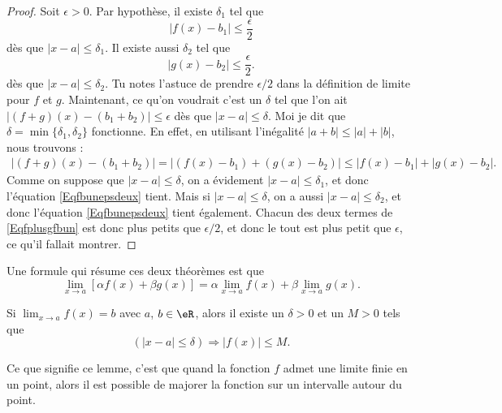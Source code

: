 \begin{proof}
	Soit $\epsilon>0$. Par hypothèse, il existe $\delta_1$ tel que
	\begin{equation}	\label{Eqfbunepsdeux}
	  | f(x)-b_1 |\leq \frac{ \epsilon }{ 2 }
	\end{equation}
	dès que $| x-a |\leq\delta_1$. Il existe aussi $\delta_2$ tel que 
	\begin{equation} 	\label{Eqgbdeuxepsdeux}
	  | g(x)-b_2 |\leq \frac{ \epsilon }{ 2 }.
	\end{equation}
	dès que $| x-a |\leq \delta_2$. Tu notes l'astuce de prendre $\epsilon/2$ dans la définition de limite pour $f$ et $g$. Maintenant, ce qu'on voudrait c'est un $\delta$ tel que l'on ait $| (f+g)(x)-(b_1+b_2) |\leq \epsilon$ dès que $| x-a |\leq \delta$. Moi je dit que $\delta=\min\{ \delta_1,\delta_2 \}$ fonctionne. En effet, en utilisant l'inégalité $| a+b |\leq | a |+| b |$, nous trouvons :
	\begin{align}
	| (f+g)(x)-(b_1+b_2) |=| (f(x)-b_1)+(g(x)-b_2) |
			\leq | f(x)-b_1 |+| g(x)-b_2 |.		\label{Eqfplusgfbun}
	\end{align}
	Comme on suppose que $| x-a |\leq\delta$, on a évidement $| x-a |\leq\delta_1$, et donc l'équation \eqref{Eqfbunepsdeux} tient. Mais si $| x-a |\leq\delta$, on a aussi $| x-a |\leq\delta_2$, et donc l'équation  \eqref{Eqfbunepsdeux} tient également. Chacun des deux termes de \eqref{Eqfplusgfbun} est donc plus petits que $\epsilon/2$, et donc le tout est plus petit que $\epsilon$, ce qu'il fallait montrer.

\end{proof}

Une formule qui résume ces deux théorèmes est que
\begin{equation}	\label{EqLimLinRes}
	\lim_{x\to a}[\alpha f(x)+\beta g(x)]=\alpha\lim_{x\to a}f(x)+\beta\lim_{x\to a}g(x).
\end{equation}

\begin{lemma}		\label{LemLimMajorableVois}
	Si $\lim_{x\to a}f(x)=b$ avec $a$, $b\in\eR$, alors il existe un $\delta>0$ et un $M>0$ tels que 
	\[ 
		(| x-a |\leq\delta)\Rightarrow | f(x) |\leq M.
	\]

\end{lemma}

Ce que signifie ce lemme, c'est que quand la fonction $f$ admet une limite finie en un point, alors il est possible de majorer la fonction sur un intervalle autour du point.

